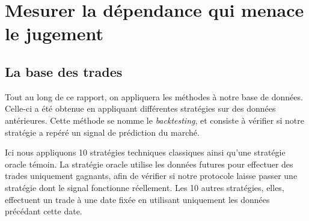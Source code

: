 \chapter{Mesurer la dépendance qui menace le jugement}
\label{chap:donnees}

\section{La base des trades}
\label{sec:donnees-trades}


Tout au long de ce rapport, on appliquera les méthodes à notre base
de données. Celle-ci a été obtenue en appliquant différentes stratégies
sur des données antérieures. Cette méthode se nomme le \emph{backtesting}, et
consiste à vérifier si notre stratégie a repéré un signal de prédiction
du marché.

Ici nous appliquons 10 stratégies techniques classiques ainsi qu'une stratégie
oracle témoin.
La stratégie oracle utilise les données futures pour effectuer des
trades uniquement gagnants, afin de vérifier si notre protocole laisse passer
une stratégie dont le signal fonctionne réellement.
Les 10 autres stratégies, elles, effectuent un trade à une date fixée en
utilisant uniquement les données précédant cette date. 

